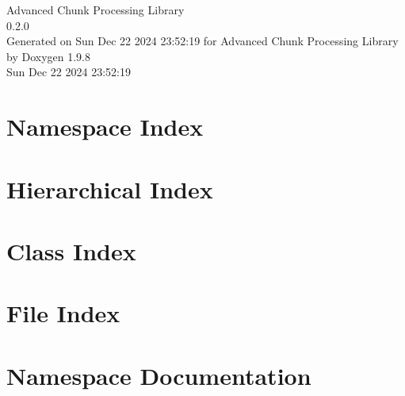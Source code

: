 \documentclass[twoside]{book}
\newcommand{\+}{\discretionary{\mbox{\scriptsize$\hookleftarrow$}}{}{}}
\newcommand{\clearemptydoublepage}{%
    \newpage{\pagestyle{empty}\cleardoublepage}%
  }
\begin{document}
  \raggedbottom
    \hypersetup{pageanchor=false,
                bookmarksnumbered=true,
                pdfencoding=unicode
               }
  \begin{titlepage}
  \vspace*{7cm}
  \begin{center}%
  {\Large Advanced Chunk Processing Library}\\
  [1ex]\large 0.\+2.\+0 \\
  \vspace*{1cm}
  {\large Generated on Sun Dec 22 2024 23\+:52\+:19 for Advanced Chunk Processing Library by Doxygen 1.9.8}\\
    \vspace*{0.5cm}
    {\small Sun Dec 22 2024 23:52:19}
  \end{center}
  \end{titlepage}
  \clearemptydoublepage
  \tableofcontents
  \clearemptydoublepage
  \hypersetup{pageanchor=true}

\chapter{Namespace Index}

\chapter{Hierarchical Index}

\chapter{Class Index}

\chapter{File Index}

\chapter{Namespace Documentation}








\end{document}
